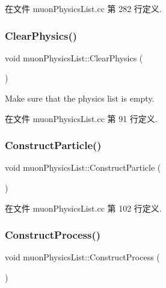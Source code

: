 在文件 muon\+Physics\+List.\+cc 第 282 行定义.

\mbox{\label{classmuonPhysicsList_a4a34c6141040c0d5bd34396df7d10ff3}} 
\subsubsection{\texorpdfstring{Clear\+Physics()}{ClearPhysics()}}
{\footnotesize\ttfamily void muon\+Physics\+List\+::\+Clear\+Physics (\begin{DoxyParamCaption}{ }\end{DoxyParamCaption})}



Make sure that the physics list is empty. 



在文件 muon\+Physics\+List.\+cc 第 91 行定义.

\mbox{\label{classmuonPhysicsList_aefb2f75ee5958cfcf78b50c479523703}} 
\subsubsection{\texorpdfstring{Construct\+Particle()}{ConstructParticle()}}
{\footnotesize\ttfamily void muon\+Physics\+List\+::\+Construct\+Particle (\begin{DoxyParamCaption}{ }\end{DoxyParamCaption})\hspace{0.3cm}{\ttfamily [virtual]}}



在文件 muon\+Physics\+List.\+cc 第 102 行定义.

\mbox{\label{classmuonPhysicsList_aac0f8e3bd5e0509f96613e150554d06e}} 
\subsubsection{\texorpdfstring{Construct\+Process()}{ConstructProcess()}}
{\footnotesize\ttfamily void muon\+Physics\+List\+::\+Construct\+Process (\begin{DoxyParamCaption}{ }\end{DoxyParamCaption})\hspace{0.3cm}{\ttfamily [virtual]}}



